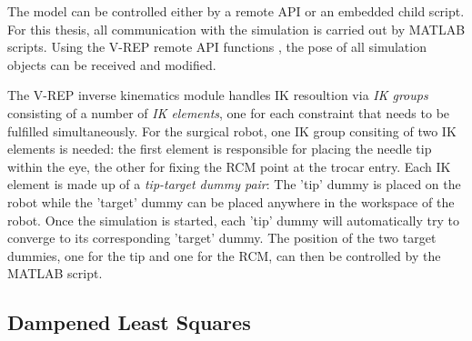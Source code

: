 The model can be controlled either by a remote API or an embedded child script. For this thesis, all communication with the simulation is carried out by MATLAB \cite{MATLAB} scripts. Using the V-REP remote API functions \cite{remoteAPI}, the pose of all simulation objects can be received and modified. 

The V-REP inverse kinematics module handles IK resoultion via \textit{IK groups} consisting of a number of \textit{IK elements}, one for each constraint that needs to be fulfilled simultaneously. For the surgical robot, one IK group consiting of two IK elements is needed: the first element is responsible for placing the needle tip within the eye, the other for fixing the RCM point at the trocar entry. Each IK element is made up of a \textit{tip-target dummy pair}: The 'tip' dummy is placed on the robot while the 'target' dummy can be placed anywhere in the workspace of the robot. Once the simulation is started, each 'tip' dummy will automatically try to converge to its corresponding 'target' dummy. The position of the two target dummies, one for the tip and one for the RCM, can then be controlled by the MATLAB script.

\subsection{Dampened Least Squares}\label{DLS}

